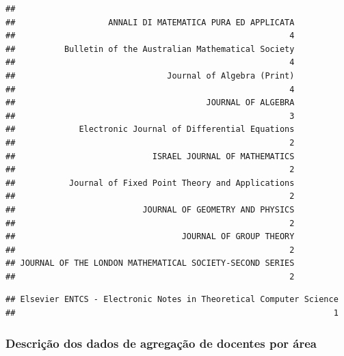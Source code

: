 \documentclass[]{article}
\newenvironment{Shaded}{\begin{snugshade}}{\end{snugshade}}
\newcommand{\KeywordTok}[1]{\textcolor[rgb]{0.13,0.29,0.53}{\textbf{#1}}}
\newcommand{\DataTypeTok}[1]{\textcolor[rgb]{0.13,0.29,0.53}{#1}}
\newcommand{\DecValTok}[1]{\textcolor[rgb]{0.00,0.00,0.81}{#1}}
\newcommand{\StringTok}[1]{\textcolor[rgb]{0.31,0.60,0.02}{#1}}
\newcommand{\OtherTok}[1]{\textcolor[rgb]{0.56,0.35,0.01}{#1}}
\newcommand{\OperatorTok}[1]{\textcolor[rgb]{0.81,0.36,0.00}{\textbf{#1}}}
\newcommand{\NormalTok}[1]{#1}
\begin{document}
\begin{verbatim}
## 
##                   ANNALI DI MATEMATICA PURA ED APPLICATA 
##                                                        4 
##          Bulletin of the Australian Mathematical Society 
##                                                        4 
##                               Journal of Algebra (Print) 
##                                                        4 
##                                       JOURNAL OF ALGEBRA 
##                                                        3 
##             Electronic Journal of Differential Equations 
##                                                        2 
##                            ISRAEL JOURNAL OF MATHEMATICS 
##                                                        2 
##           Journal of Fixed Point Theory and Applications 
##                                                        2 
##                          JOURNAL OF GEOMETRY AND PHYSICS 
##                                                        2 
##                                  JOURNAL OF GROUP THEORY 
##                                                        2 
## JOURNAL OF THE LONDON MATHEMATICAL SOCIETY-SECOND SERIES 
##                                                        2
\end{verbatim}

\begin{Shaded}
\end{Shaded}

\begin{verbatim}
## Elsevier ENTCS - Electronic Notes in Theoretical Computer Science 
##                                                                 1
\end{verbatim}

\subsubsection{Descrição dos dados de agregação de docentes por
área}\label{descricao-dos-dados-de-agregacao-de-docentes-por-area}
\end{document}
